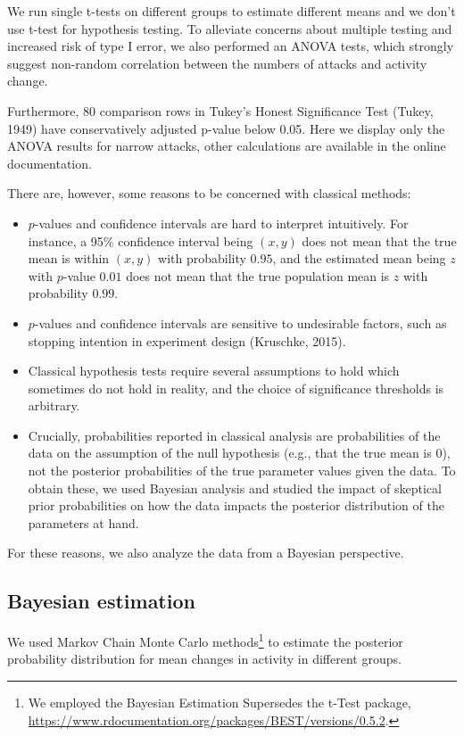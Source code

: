 \documentclass[10pt,dvipsnames]{scrartcl}
\begin{document}
We run single t-tests on different groups to estimate different means
and we don't use t-test for hypothesis testing. To alleviate concerns
about multiple testing and increased risk of type I error, we also
performed an ANOVA tests, which strongly suggest non-random correlation
between the numbers of attacks and activity change.

Furthermore, 80 comparison rows in Tukey's Honest Significance Test
(Tukey, 1949) have conservatively adjusted p-value below 0.05. Here we
display only the ANOVA results for narrow attacks, other calculations
are available in the online documentation.

There are, however, some reasons to be concerned with classical methods:

\begin{itemize}
\item
  \(p\)-values and confidence intervals are hard to interpret
  intuitively. For instance, a 95\% confidence interval being \((x,y)\)
  does not mean that the true mean is within \((x,y)\) with probability
  \(0.95\), and the estimated mean being \(z\) with \(p\)-value \(0.01\)
  does not mean that the true population mean is \(z\) with probability
  \(0.99\).
\item
  \(p\)-values and confidence intervals are sensitive to undesirable
  factors, such as stopping intention in experiment design (Kruschke,
  2015).
\item
  Classical hypothesis tests require several assumptions to hold which
  sometimes do not hold in reality, and the choice of significance
  thresholds is arbitrary.
\item
  Crucially, probabilities reported in classical analysis are
  probabilities of the data on the assumption of the null hypothesis
  (e.g., that the true mean is 0), not the posterior probabilities of
  the true parameter values given the data. To obtain these, we used
  Bayesian analysis and studied the impact of skeptical prior
  probabilities on how the data impacts the posterior distribution of
  the parameters at hand.
\end{itemize}

For these reasons, we also analyze the data from a Bayesian perspective.

\subsection{Bayesian estimation}

We used Markov Chain Monte Carlo methods\footnote{We employed the
  \textsf{Bayesian Estimation Supersedes the t-Test} package,
  \url{https://www.rdocumentation.org/packages/BEST/versions/0.5.2}.} to
estimate the posterior probability distribution for mean changes in
activity in different groups.
\end{document}
